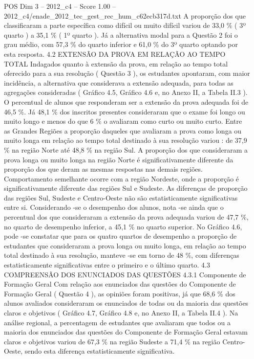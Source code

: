 \begin{textsample}{POS Dim 3 – 2012\_c4 – Score 1.00 – 2012\_c4/enade\_2012\_tec\_gest\_rec\_hum\_c62ecb317d.txt}
A proporção dos que classificaram a parte específica como difícil ou muito difícil variou de 33,0 \% ( 3º quarto ) a 35,1 \% ( 1º quarto ).
Já a alternativa modal para a Questão 2 foi o grau médio, com 57,3 \% do quarto inferior e 61,0 \% do 3º quarto optando por esta resposta. 4.2 EXTENSÃO DA PROVA EM RELAÇÃO AO TEMPO TOTAL Indagados quanto à extensão da prova, em relação ao tempo total oferecido para a sua resolução ( Questão 3 ), os estudantes apontaram, com maior incidência, a alternativa que considerava a extensão adequada, para todas as agregações consideradas ( Gráfico 4.5, Gráfico 4.6 e, no Anexo II, a Tabela II.3 ).
O percentual de alunos que responderam ser a extensão da prova adequada foi de 46,5 \%.
Já 48,1 \% dos inscritos presentes consideraram que o exame foi longo ou muito longo e menos do que 6 \% o avaliaram como curto ou muito curto.
Entre as Grandes Regiões a proporção daqueles que avaliaram a prova como longa ou muito longa em relação ao tempo total destinado à sua resolução variou : de 37,9 \% na região Norte até 48,8 \% na região Sul.
A proporção dos que consideraram a prova longa ou muito longa na região Norte é significativamente diferente da proporção dos que deram as mesmas respostas nas demais regiões.
Comportamento semelhante ocorre com a região Nordeste, onde a proporção é significativamente diferente das regiões Sul e Sudeste.
As diferenças de proporção das regiões Sul, Sudeste e Centro-Oeste não são estatisticamente significativas entre si.
Considerando -se o desempenho dos alunos, nota -se ainda que o percentual dos que consideraram a extensão da prova adequada variou de 47,7 \%, no quarto de desempenho inferior, a 45,1 \% no quarto superior.
No Gráfico 4.6, pode -se constatar que para os quatro quartos de desempenho a proporção de estudantes que consideraram a prova longa ou muito longa, em relação ao tempo total destinado à sua resolução, manteve -se em torno de 48 \%, com diferenças estatisticamente significativas entre o primeiro e o último quarto. 4.3 COMPREENSÃO DOS ENUNCIADOS DAS QUESTÕES 4.3.1 Componente de Formação Geral Com relação aos enunciados das questões do Componente de Formação Geral ( Questão 4 ), as opiniões foram positivas, já que 68,6 \% dos alunos avaliados consideraram os enunciados de todas ou da maioria das questões claros e objetivos ( Gráfico 4.7, Gráfico 4.8 e, no Anexo II, a Tabela II.4 ).
Na análise regional, a percentagem de estudantes que avaliaram que todos ou a maioria dos enunciados das questões do Componente de Formação Geral estavam claros e objetivos variou de 67,3 \% na região Sudeste a 71,4 \% na região Centro-Oeste, sendo esta diferença estatisticamente significativa.

\end{textsample}
